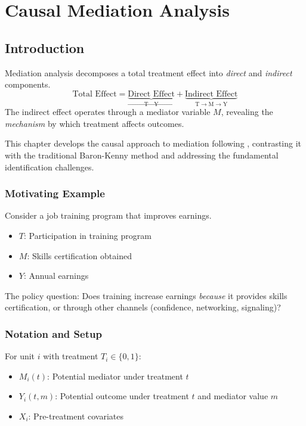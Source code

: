 \chapter{Causal Mediation Analysis}
\label{ch:mediation}

\section{Introduction}

Mediation analysis decomposes a total treatment effect into \textit{direct} and \textit{indirect} components.
\begin{equation}
\text{Total Effect} = \underbrace{\text{Direct Effect}}_{\text{T} \to \text{Y}} + \underbrace{\text{Indirect Effect}}_{\text{T} \to \text{M} \to \text{Y}}
\end{equation}
The indirect effect operates through a mediator variable $M$, revealing the \textit{mechanism} by which treatment affects outcomes.

This chapter develops the causal approach to mediation following \textcite{imai2010general}, contrasting it with the traditional Baron-Kenny method and addressing the fundamental identification challenges.

\subsection{Motivating Example}

Consider a job training program that improves earnings.
\begin{itemize}
\item $T$: Participation in training program
\item $M$: Skills certification obtained
\item $Y$: Annual earnings
\end{itemize}
The policy question: Does training increase earnings \textit{because} it provides skills certification, or through other channels (confidence, networking, signaling)?

\subsection{Notation and Setup}

For unit $i$ with treatment $T_i \in \{0,1\}$:
\begin{itemize}
\item $M_i(t)$: Potential mediator under treatment $t$
\item $Y_i(t, m)$: Potential outcome under treatment $t$ and mediator value $m$
\item $X_i$: Pre-treatment covariates
\end{itemize}

